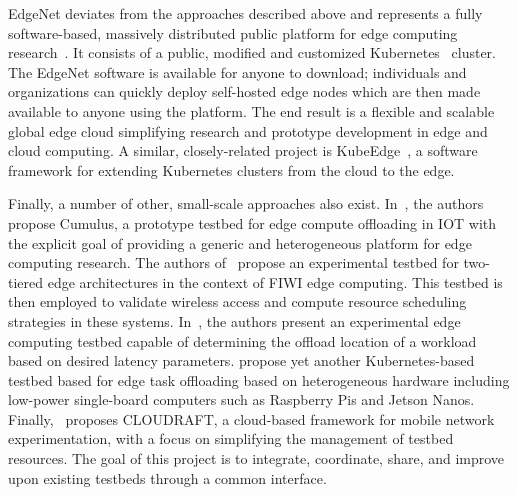 EdgeNet deviates from the approaches described above and represents a fully software-based, massively distributed public platform for edge computing research~\cite{cappos2018edgenet,senel2021edgenet1,senel2021edgenet2}.
It consists of a public, modified and customized Kubernetes~\cite{kubernetes} cluster.
The EdgeNet software is available for anyone to download;
individuals and organizations can quickly deploy self-hosted edge nodes which are then made available to anyone using the platform.
The end result is a flexible and scalable global edge cloud simplifying research and prototype development in edge and cloud computing.
A similar, closely-related project is KubeEdge~\cite{xiong2018extend}, a software framework for extending Kubernetes clusters from the cloud to the edge.

Finally, a number of other, small-scale approaches also exist.
In~\cite{gedawy2016cumulus}, the authors propose Cumulus, a prototype testbed for edge compute offloading in \gls{IOT} with the explicit goal of providing a generic and heterogeneous platform for edge computing research.
The authors of~\cite{rimal2018experimental} propose an experimental testbed for two-tiered edge architectures in the context of \gls{FIWI} edge computing.
This testbed is then employed to validate wireless access and compute resource scheduling strategies in these systems.
In~\cite{yamanaka2021design}, the authors present an experimental edge computing testbed capable of determining the offload location of a workload based on desired latency parameters.
\cite{diao2019scalable} propose yet another Kubernetes-based testbed based for edge task offloading based on heterogeneous hardware including low-power single-board computers such as Raspberry Pis and Jetson Nanos.
Finally,\ \cite{moorthy2022cloudraft} proposes \gls{CLOUDRAFT}, a cloud-based framework for mobile network experimentation, with a focus on simplifying the management of testbed resources.
The goal of this project is to integrate, coordinate, share, and improve upon existing testbeds through a common interface.


\section{}\label{background:wca}

